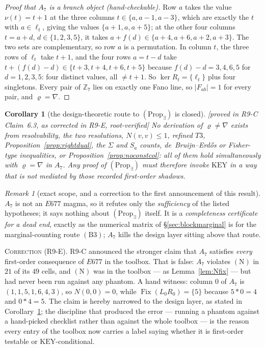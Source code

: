 \documentclass[11pt]{article}
\theoremstyle{plain}
\newtheorem{corollary}[theorem]{Corollary}
\theoremstyle{definition}
\theoremstyle{remark}
\newtheorem*{remark*}{Remark}
\numberwithin{equation}{section}
\newcommand{\Z}{\mathbb{Z}}
\newcommand{\op}{\mathbin{*}}
\newcommand{\Fix}{\operatorname{Fix}}
\newcommand{\statusbox}[1]{{\small\sloppy\textsf{[#1]}}}
\newcommand{\PROVED}[1]{\statusbox{proved in #1, root-verified}}
\begin{document}
\begin{proof}[Proof that $A_7$ is a branch object (hand-checkable)]
Row $a$ takes the value $\nu(t) = t+1$ at the three columns $t\in\{a,a-1,a-3\}$,
which are exactly the $t$ with $a\in\ell_t$, giving the values $\{a+1,a,a+5\}$; at
the other four columns $t = a+d$, $d\in\{1,2,3,5\}$, it takes
$a+f(d)\in\{a+4,a+6,a+2,a+3\}$. The two sets are complementary, so row $a$ is a
permutation. In column $t$, the three rows of $\ell_t$ take $t+1$, and the four
rows $a = t-d$ take $t+(f(d)-d)\in\{t+3,t+4,t+6,t+5\}$ because
$f(d)-d = 3,4,6,5$ for $d = 1,2,3,5$: four distinct values, all $\ne t+1$. So
$\ker R_t = \{\ell_t\}$ plus four singletons. Every pair of $\Z_7$ lies on exactly
one Fano line, so $|F_{ab}| = 1$ for every pair, and $\varrho = \nabla$.
\end{proof}

\begin{corollary}[the design-theoretic route to $(\mathrm{Prop}_{\exists})$ is
closed]\label{cor:designdead}
\PROVED{R9-C Claim~6.3, as corrected in R9-E}
No derivation of $\varrho\ne\nabla$ exists from resolvability, the two
resolutions, $N(v,v)\le1$, refined $T3$, Proposition~\ref{prop:rightdual}, the
$\Sigma$ and $S_a$ counts, de~Bruijn--Erd\H{o}s or Fisher-type inequalities, or
Proposition~\ref{prop:noconstcol}: all of them hold simultaneously with
$\varrho = \nabla$ in $A_7$. Any proof of $(\mathrm{Prop}_{\exists})$ must
therefore invoke $\mathrm{KEY}$ in a way that is \emph{not} mediated by those
recorded first-order shadows.
\end{corollary}

\begin{remark*}[exact scope, and a correction to the first announcement of this
result]
$A_7$ is not an $E677$ magma, so it refutes only the \emph{sufficiency} of the
listed hypotheses; it says nothing about $(\mathrm{Prop}_{\exists})$ itself. It is
a \emph{completeness certificate for a dead end}, exactly as the numerical matrix
of \S\ref{sec:blockmarginal} is for the marginal-counting route $(\mathrm{B}3)$;
$A_7$ kills the design layer sitting above that route.

\textsc{Correction (R9-E).} R9-C announced the stronger claim that $A_7$ satisfies
\emph{every} first-order consequence of $E677$ in the toolbox. That is false:
$A_7$ violates $(\mathrm{N})$ in $21$ of its $49$ cells, and $(\mathrm{N})$ was in
the toolbox --- as Lemma~\ref{lem:Nfix} --- but had never been run against any
phantom. A hand witness: column $0$ of $A_7$ is $(1,1,5,1,6,4,3)$, so
$N(0,0) = 0$, while $\Fix(L_0R_0) = \{5\}$ because $5\op0 = 4$ and $0\op4 = 5$.
The claim is hereby narrowed to the design layer, as stated in
Corollary~\ref{cor:designdead}; the discipline that produced the error --- running
a phantom against a hand-picked checklist rather than against the whole toolbox
--- is the reason every entry of the toolbox now carries a label saying whether it
is first-order testable or $\mathrm{KEY}$-conditional.
\end{remark*}
\end{document}
